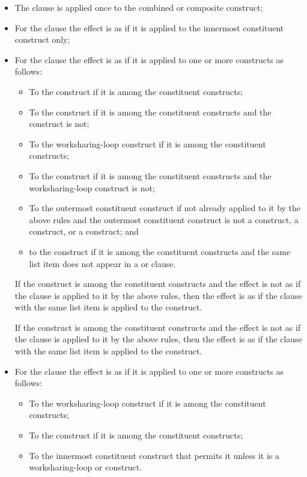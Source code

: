 \begin{itemize}
\item The  clause is applied once to the combined or 
      composite construct;
\item For the  clause the effect is as if it is applied 
      to the innermost constituent construct only;
\item For the  clause the effect is as if it is applied 
      to one or more constructs as follows:
\begin{itemize}
\item To the  construct if it is among the constituent constructs;
\item To the  construct if it is among the constituent constructs and 
      the  construct is not;
\item To the worksharing-loop construct if it is among the constituent constructs;
\item To the  construct if it is among the constituent
      constructs and the worksharing-loop construct is not;
\item To the outermost constituent construct if not already applied to it by the 
      above rules and the outermost constituent construct is not a  
      construct, a  construct, or a  construct; and
\item to the  construct if it is among the constituent
      constructs and the same list item does not appear in a  
      or  clause.
\end{itemize}

If the  construct is among the constituent constructs and the
effect is not as if the  clause is applied to it by the
above rules, then the effect is as if the  clause with the same
list item is applied to the  construct.

If the  construct is among the constituent constructs and the
effect is not as if the  clause is applied to it by the
above rules, then the effect is as if the  clause with the same
list item is applied to the  construct.

\item For the  clause the effect is as if it is applied to 
one or more constructs as follows:

\begin{itemize}
\item To the worksharing-loop construct if it is among the constituent constructs;
\item To the  construct if it is among the constituent constructs;
\item To the innermost constituent construct that permits it unless it is a
      worksharing-loop or  construct.
\end{itemize}


\end{itemize}
